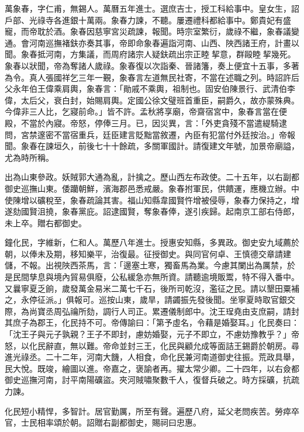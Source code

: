 \begin{pinyinscope}
萬象春，字仁甫，無錫人。萬曆五年進士。選庶吉士，授工科給事中。皇女生，詔戶部、光祿寺各進銀十萬兩。象春力諫，不聽。屢遷禮科都給事中。鄭貴妃有盛寵，而帝耽於酒。象春因慈寧宮災疏諫，報聞。時宗室繁衍，歲祿不繼，象春議變通。會河南巡撫褚鈇亦奏其事，帝即命象春遍詣河南、山西、陜西諸王府，計畫以聞。象春抵河南，方集議，而周府諸宗人疑鈇疏出宗正睦挈意，群毆睦挈幾死。象春以狀聞，帝為奪諸人歲祿。象春復以次詣秦、晉諸籓，奏上便宜十五事，多著為令。真人張國祥乞三年一覲，象春言左道無民社寄，不當在述職之列。時詔許后父永年伯王偉乘肩輿，象春言：「勛戚不乘輿，祖制也。固安伯陳景行、武清伯李偉，太后父，衰白封，始賜肩輿。定國公徐文璧班首重臣，嗣爵久，故亦蒙殊典。今偉非三人比，乞寢前命。」皆不許。孟秋將享廟，帝齋宿宮中，象春言當在便殿，不當於內寢。帝怒，停俸三月。已，因災異，言：「外吏貪殘不當遣緹騎逮問，宮禁邃密不當宿重兵，廷臣建言貶黜當敘遷，內臣有犯當付外廷按治。」帝報聞。象春在諫垣久，前後七十十餘疏，多關軍國計。請復建文年號，加景帝廟謚，尤為時所稱。

出為山東參政。妖賊郭大通為亂，計擒之。歷山西左布政使。二十五年，以右副都御史巡撫山東。倭躪朝鮮，濱海郡邑悉戒嚴。象春拊軍民，供饋運，應機立辦。中使陳增以礦稅至，象春疏論其害。福山知縣韋國賢忤增被侵辱，象春力保持之，增遂劾國賢沮撓，象春黨庇。詔逮國賢，奪象春俸，遂引疾歸。起南京工部右侍郎，未上卒。贈右都御史。

鐘化民，字維新，仁和人。萬歷八年進士。授惠安知縣，多異政。御史安九域薦於朝，以俸未及期，移知樂平，治復最。征授御史。與同官何卓、王慎德交章請建儲，不報。出視陜西茶馬，言：「邊塞土寒，獨畜馬為業。今慮其闌出為厲禁，於是民間孳息與境內貿易俱廢，公私緩急亦無所資。請聽逾境販鬻，特不得入番中。又曩寧夏乏餉，歲發萬金易米二萬七千石，後所司乾沒，濫征之民。請以墾田粟補之，永停征派。」俱報可。巡按山東，歲旱，請蠲振先發後聞。坐寧夏時取官銀交際，為尚寶丞周弘禴所劾，調行人司正。累遷儀制郎中。沈王珵堯由支庶嗣，請封其庶子為郡王，化民持不可。帝傳諭曰：「第予虛名，令藉是婚娶耳。」化民奏曰：「沈王子與元子孰親？王子不即封，慮妨婚娶，元子不即立，不慮妨豫教乎？」帝怒，以化民辭直，無以難。帝命並封三王，化民與顧允成等面詰王錫爵於朝房。尋進光祿丞。二十二年，河南大饑，人相食，命化民兼河南道御史往振。荒政具舉，民大悅。既竣，繪圖以進。帝嘉之，褒諭者再。擢太常少卿。二十四年，以右僉都御史巡撫河南，討平南陽礦盜。夾河賊嘯聚數千人，復督兵破之。時方採礦，抗疏力諫。

化民短小精悍，多智計。居官勤厲，所至有聲。遍歷八府，延父老問疾苦。勞瘁卒官，士民相率頌於朝。詔贈右副都御史，賜祠曰忠惠。


\end{pinyinscope}
